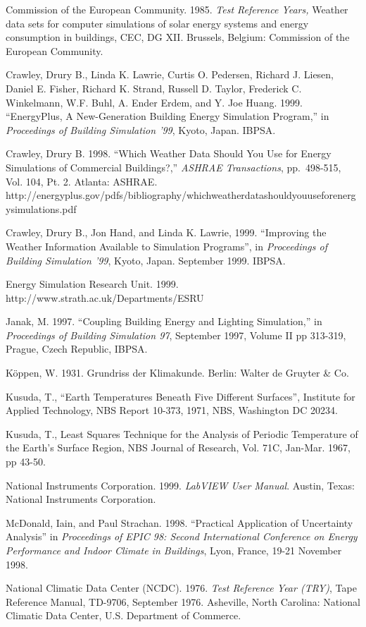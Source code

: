 Commission of the European Community. 1985. \emph{Test Reference Years,} Weather data sets for computer simulations of solar energy systems and energy consumption in buildings, CEC, DG XII. Brussels, Belgium: Commission of the European Community.

Crawley, Drury B., Linda K. Lawrie, Curtis O. Pedersen, Richard J. Liesen, Daniel E. Fisher, Richard K. Strand, Russell D. Taylor, Frederick C. Winkelmann, W.F. Buhl, A. Ender Erdem, and Y. Joe Huang. 1999. ``EnergyPlus, A New-Generation Building Energy Simulation Program,'' in \emph{Proceedings of Building Simulation '99}, Kyoto, Japan. IBPSA.

Crawley, Drury B. 1998. ``Which Weather Data Should You Use for Energy Simulations of Commercial Buildings?,'' \emph{ASHRAE Transactions}, pp.~498-515, Vol. 104, Pt. 2. Atlanta: ASHRAE. http://energyplus.gov/pdfs/bibliography/whichweatherdatashouldyouuseforenergysimulations.pdf

Crawley, Drury B., Jon Hand, and Linda K. Lawrie, 1999. ``Improving the Weather Information Available to Simulation Programs'', in \emph{Proceedings of Building Simulation '99}, Kyoto, Japan. September 1999. IBPSA.

Energy Simulation Research Unit. 1999. http://www.strath.ac.uk/Departments/ESRU

Janak, M. 1997. ``Coupling Building Energy and Lighting Simulation,'' in \emph{Proceedings of Building Simulation 97}, September 1997, Volume II pp 313-319, Prague, Czech Republic, IBPSA.

Köppen, W. 1931. Grundriss der Klimakunde. Berlin: Walter de Gruyter \& Co.

Kusuda, T., ``Earth Temperatures Beneath Five Different Surfaces'', Institute for Applied Technology, NBS Report 10-373, 1971, NBS, Washington DC 20234.

Kusuda, T., Least Squares Technique for the Analysis of Periodic Temperature of the Earth's Surface Region, NBS Journal of Research, Vol. 71C, Jan-Mar. 1967, pp 43-50.

National Instruments Corporation. 1999. \emph{LabVIEW User Manual}. Austin, Texas: National Instruments Corporation.

McDonald, Iain, and Paul Strachan. 1998. ``Practical Application of Uncertainty Analysis'' in \emph{Proceedings of EPIC 98: Second International Conference on Energy Performance and Indoor Climate in Buildings}, Lyon, France, 19-21 November 1998.

National Climatic Data Center (NCDC). 1976. \emph{Test Reference Year (TRY)}, Tape Reference Manual, TD-9706, September 1976. Asheville, North Carolina: National Climatic Data Center, U.S. Department of Commerce.

